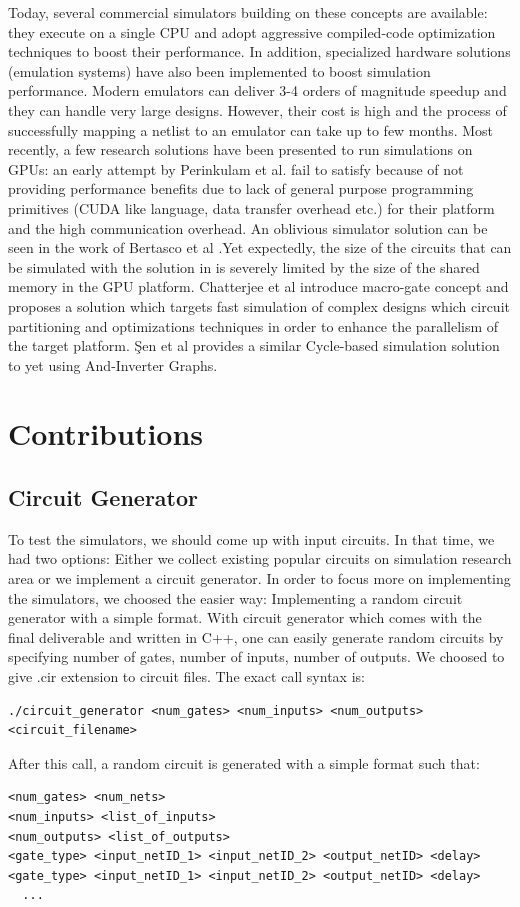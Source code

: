 \documentclass[a4paper,onesided,12pt]{report}
\begin{document}
Today, several commercial simulators building on these concepts
are available: they execute on a single CPU and adopt aggressive
compiled-code optimization techniques to boost their performance.
In addition, specialized hardware solutions (emulation systems)
have also been implemented to boost simulation performance.
 Modern emulators can deliver 3-4 orders of magnitude
speedup and they can handle very large designs. However, their
cost is high and the process of successfully mapping
a netlist to an emulator can take up to few months.
Most recently, a few research solutions have been presented to
run simulations on GPUs: an early attempt by Perinkulam et al.\cite{perinkulam} fail to satisfy because of not providing performance benefits due to lack of general purpose
programming primitives (CUDA like language, data transfer overhead etc.) for their platform and the high communication
overhead. An oblivious simulator solution can be seen in the work of Bertasco et al \cite{bertasco}.Yet expectedly, the size of the circuits that can be simulated with the solution in \cite{bertasco} is severely limited by the size of the shared memory in the GPU platform.
Chatterjee et al\cite{chatterjee} introduce macro-gate concept and proposes a solution which targets fast simulation of complex designs which circuit partitioning and optimizations techniques in order to enhance the parallelism of the target platform. Şen et al\cite{sen} provides a similar Cycle-based simulation solution to \cite{chatterjee} yet using And-Inverter Graphs.

\chapter{Contributions}
\label{chapter:contributions}
 
\section{Circuit Generator}
To test the simulators, we should come up with input circuits. In that time, we had two options: Either we collect existing popular circuits on simulation research area or we implement a circuit generator. In order to focus more on implementing the simulators, we choosed the easier way: Implementing a random circuit generator with a simple format. With circuit generator which comes with the final deliverable and written in C++, one can easily generate random circuits by specifying number of gates, number of inputs, number of outputs. We choosed to give .cir extension to circuit files. The exact call syntax is:
\begin{verbatim}
./circuit_generator <num_gates> <num_inputs> <num_outputs> <circuit_filename>
\end{verbatim} 
After this call, a random circuit is generated with a simple format such that:
\begin{verbatim}
<num_gates> <num_nets>
<num_inputs> <list_of_inputs>
<num_outputs> <list_of_outputs>
<gate_type> <input_netID_1> <input_netID_2> <output_netID> <delay>
<gate_type> <input_netID_1> <input_netID_2> <output_netID> <delay>
  ...
 \end{verbatim}
 
\end{document}
